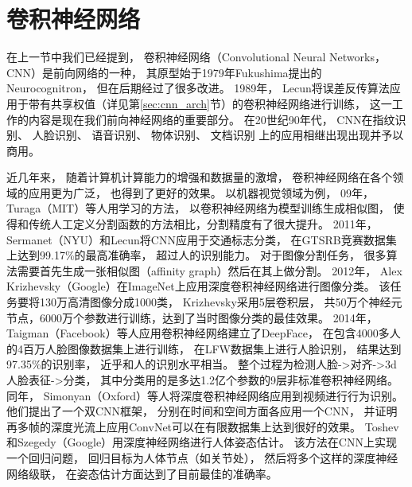 \section{卷积神经网络}\label{sec:CNN}
在上一节中我们已经提到， 卷积神经网络（Convolutional Neural Networks， CNN）是前向网络的一种， 其原型始于1979年Fukushima提出的Neurocognitron\cite{fukushima1979neural}， 但在后期经过了很多改进。 1989年， Lecun将误差反传算法应用于带有共享权值（详见第\ref{sec:cnn_arch}节）的卷积神经网络进行训练\cite{lecun1989backpropagation}， 这一工作的内容是现在我们前向神经网络的重要部分。 在20世纪90年代， CNN在指纹识别\cite{baldi1993neural}、 人脸识别\cite{lawrence1997face}、 语音识别\cite{abdel2012applying}、 物体识别\cite{nebauer1998evaluation}、 文档识别\cite{lecun1998gradient} 上的应用相继出现出现并予以商用。  

近几年来， 随着计算机计算能力的增强和数据量的激增， 卷积神经网络在各个领域的应用更为广泛， 也得到了更好的效果。 以机器视觉领域为例， 09年， Turaga（MIT）等人用学习的方法， 以卷积神经网络为模型训练生成相似图\cite{turaga2010convolutional}， 使得和传统人工定义分割函数的方法相比，分割精度有了很大提升。 2011年， Sermanet（NYU）和Lecun将CNN应用于交通标志分类\cite{sermanet2011traffic}， 在GTSRB竞赛数据集\cite{stallkamp2011german}上达到99.17\%的最高准确率， 超过人的识别能力。 对于图像分割任务， 很多算法需要首先生成一张相似图（affinity graph）然后在其上做分割。 2012年， Alex Krizhevsky（Google）在ImageNet\cite{deng2009imagenet}上应用深度卷积神经网络进行图像分类\cite{krizhevsky2012imagenet}。 该任务要将130万高清图像分成1000类， Krizhevsky采用5层卷积层， 共50万个神经元节点，6000万个参数进行训练，达到了当时图像分类的最佳效果。 2014年， Taigman（Facebook）等人应用卷积神经网络建立了DeepFace\cite{taigman2014deepface}， 在包含4000多人的4百万人脸图像数据集上进行训练， 在LFW数据集\cite{huang2007labeled}上进行人脸识别， 结果达到97.35\%的识别率， 近乎和人的识别水平相当。 整个过程为检测人脸->对齐->3d人脸表征->分类， 其中分类用的是多达1.2亿个参数的9层非标准卷积神经网络。 同年， Simonyan（Oxford）等人将深度卷积神经网络应用到视频进行行为识别\cite{simonyan2014two}。 他们提出了一个双CNN框架， 分别在时间和空间方面各应用一个CNN， 并证明再多帧的深度光流上应用ConvNet可以在有限数据集上达到很好的效果。 Toshev和Szegedy（Google）用深度神经网络进行人体姿态估计\cite{toshev2014deeppose}。 该方法在CNN上实现一个回归问题， 回归目标为人体节点（如关节处）， 然后将多个这样的深度神经网络级联， 在姿态估计方面达到了目前最佳的准确率。 


